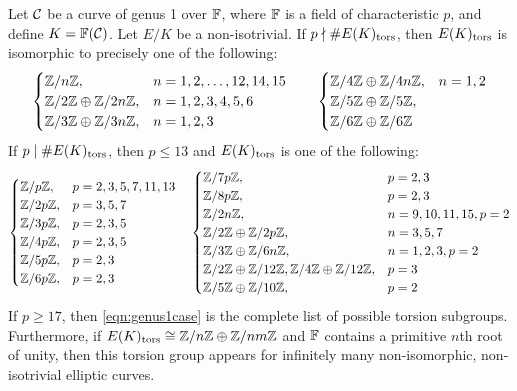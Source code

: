 \begin{thm}
Let $\mathcal{C}$ be a curve of genus 1 over $\mathbb{F}$, where $\mathbb{F}$ is a field of characteristic $p$, and define $K= \mathbb{F}(\mathcal{C})$. Let $E/K$ be a non-isotrivial. If $p \nmid \#E(K)_{\text{tors}}$, then $E(K)_{\text{tors}}$ is isomorphic to precisely one of the following:
	\begin{equation} \label{eqn:genus1case}
	\begin{cases}
	\mathbb{Z}/n\mathbb{Z}, & n= 1, 2, \ldots, 12, 14, 15 \\
	\mathbb{Z}/2\mathbb{Z} \oplus \mathbb{Z}/2n\mathbb{Z}, & n= 1, 2, 3, 4, 5, 6 \\
	\mathbb{Z}/3\mathbb{Z} \oplus \mathbb{Z}/3n\mathbb{Z}, & n= 1, 2, 3 
	\end{cases} \quad\quad
	\begin{cases}
	\mathbb{Z}/4\mathbb{Z} \oplus \mathbb{Z}/4n\mathbb{Z}, & n= 1, 2 \\
	\mathbb{Z}/5\mathbb{Z} \oplus \mathbb{Z}/5\mathbb{Z}, \\
	\mathbb{Z}/6\mathbb{Z} \oplus \mathbb{Z}/6\mathbb{Z} 
	\end{cases}
	\end{equation}
If $p \mid \#E(K)_{\text{tors}}$, then $p \leq 13$ and $E(K)_{\text{tors}}$ is one of the following:
	\[
	\begin{cases}
	\mathbb{Z}/p\mathbb{Z}, & p= 2, 3, 5, 7, 11, 13 \\
	\mathbb{Z}/2p\mathbb{Z}, & p= 3, 5, 7 \\
	\mathbb{Z}/3p\mathbb{Z}, & p= 2, 3, 5 \\
	\mathbb{Z}/4p\mathbb{Z}, & p= 2, 3, 5 \\
	\mathbb{Z}/5p\mathbb{Z}, & p= 2, 3 \\
	\mathbb{Z}/6p\mathbb{Z}, & p= 2, 3
	\end{cases} \quad
	\begin{cases}
	\mathbb{Z}/7p\mathbb{Z}, & p= 2, 3 \\
	\mathbb{Z}/8p\mathbb{Z}, & p= 2, 3 \\
	\mathbb{Z}/2n\mathbb{Z}, & n= 9, 10, 11, 15, p= 2 \\
	\mathbb{Z}/2\mathbb{Z} \oplus \mathbb{Z}/2p\mathbb{Z}, & n= 3, 5, 7 \\
	\mathbb{Z}/3\mathbb{Z} \oplus \mathbb{Z}/6n\mathbb{Z}, & n= 1, 2, 3, p= 2 \\
	\mathbb{Z}/2\mathbb{Z} \oplus \mathbb{Z}/12\mathbb{Z}, \mathbb{Z}/4\mathbb{Z} \oplus \mathbb{Z}/12\mathbb{Z}, & p= 3 \\
	\mathbb{Z}/5\mathbb{Z} \oplus \mathbb{Z}/10\mathbb{Z}, & p= 2 
	\end{cases}
	\]
If $p \geq 17$, then \eqref{eqn:genus1case} is the complete list of possible torsion subgroups. Furthermore, if $E(K)_{\text{tors}} \cong \mathbb{Z}/n\mathbb{Z} \oplus \mathbb{Z}/nm\mathbb{Z}$ and $\mathbb{F}$ contains a primitive $n$th root of unity, then this torsion group appears for infinitely many non-isomorphic, non-isotrivial elliptic curves.
\end{thm}





